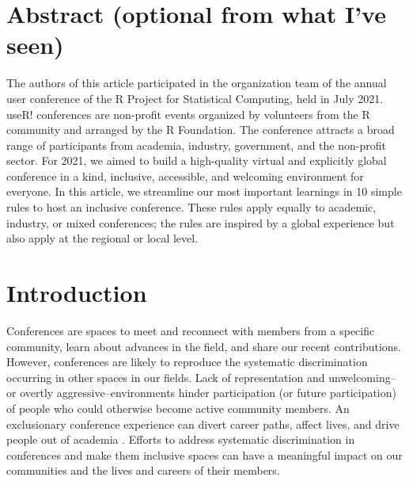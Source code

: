 \documentclass[10pt,letterpaper]{article}
\begin{document}
\section*{Abstract (optional from what I've seen)}

The authors of this article participated in the organization team of the annual user conference of the R Project for Statistical Computing, held in July 2021. useR! conferences are non-profit events organized by volunteers from the R community and arranged by the R Foundation. The conference attracts a broad range of participants from academia, industry, government, and the non-profit sector. For 2021, we aimed to build a high-quality virtual and explicitly global conference in a kind, inclusive, accessible, and welcoming environment for everyone. 
In this article, we streamline our most important learnings in 10 simple rules to host an inclusive conference. These rules apply equally to academic, industry, or mixed conferences; the rules are inspired by a global experience but also apply at the regional or local level.





\linenumbers

\section*{Introduction}

Conferences are spaces to meet and reconnect with members from a specific community, learn about advances in the field, and share our recent contributions. 
However, conferences are likely to reproduce the systematic discrimination occurring in other spaces in our fields.
Lack of representation and unwelcoming--or overtly aggressive--environments hinder participation (or future participation) of people who could otherwise become active community members. 
An exclusionary conference experience can divert career paths, affect lives, and drive people out of academia \cite{biggsAcademicConferenceChilly2018}.
Efforts to address systematic discrimination in conferences and make them inclusive spaces can have a meaningful impact on our communities and the lives and careers of their members. 
\end{document}
